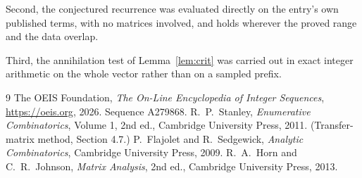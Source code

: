 \documentclass[11pt,a4paper]{article}
\theoremstyle{plain}
\theoremstyle{definition}
\begin{document}
Second, the conjectured recurrence was evaluated directly on the entry's own published terms,
with no matrices involved, and holds wherever the proved range and the data overlap.

Third, the annihilation test of Lemma~\ref{lem:crit} was carried out in exact integer
arithmetic on the whole vector rather than on a sampled prefix.

\begin{thebibliography}{9}
 The OEIS Foundation, \emph{The On-Line Encyclopedia of Integer
Sequences}, \url{https://oeis.org}, 2026. Sequence A279868.
 R.~P.~Stanley, \emph{Enumerative Combinatorics}, Volume 1, 2nd ed.,
Cambridge University Press, 2011. (Transfer-matrix method, Section 4.7.)
 P.~Flajolet and R.~Sedgewick, \emph{Analytic Combinatorics}, Cambridge
University Press, 2009.
 R.~A.~Horn and C.~R.~Johnson, \emph{Matrix Analysis}, 2nd ed., Cambridge
University Press, 2013.
\end{thebibliography}
\end{document}
